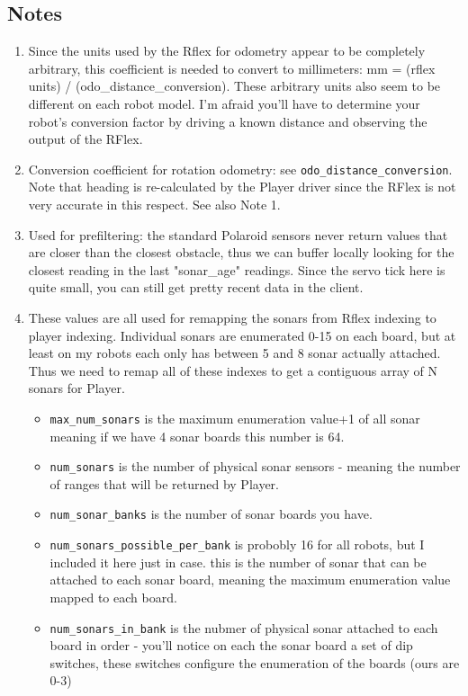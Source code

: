 \subsection*{Notes}
\begin{enumerate}
\item Since the units used by the Rflex for odometry appear to be completely
arbitrary, this coefficient is needed to convert to millimeters:
mm = (rflex units) / (odo\_distance\_conversion).  These arbitrary units also
seem to be different on each robot model. I'm afraid you'll have to determine
your robot's conversion factor by driving a known distance and observing the
output of the RFlex.
\item Conversion coefficient for rotation odometry: see {\tt odo\_distance\_conversion}. Note that heading is re-calculated by the Player driver since the RFlex is not very accurate in this respect. See also Note 1.
\item Used for prefiltering: the standard Polaroid sensors never return values that are closer than the closest obstacle, thus we can buffer locally looking for the closest reading in the last "sonar\_age" readings. Since the servo tick here is quite small, you can still get pretty recent data in the client.
\item These values are all used for remapping the sonars from Rflex indexing
to player indexing. Individual sonars are enumerated 0-15 on each board, but
at least on my robots each only has between 5 and 8 sonar actually attached.
Thus we need to remap all of these indexes to get a contiguous array of
N sonars for Player.
  \begin{itemize}
    \item {\tt max\_num\_sonars} is the maximum enumeration value+1 of all sonar
    meaning if we have 4 sonar boards this number is 64.
    \item {\tt num\_sonars} is the number of physical sonar sensors - meaning the number of ranges that will be returned by Player.
    \item {\tt num\_sonar\_banks} is the number of sonar boards you have.
    \item {\tt num\_sonars\_possible\_per\_bank} is probobly 16 for all robots,
    but I included it here just in case. this is the number of sonar that can
    be attached to each sonar board, meaning the maximum enumeration value
    mapped to each board.
    \item {\tt num\_sonars\_in\_bank} is the nubmer of physical sonar attached
    to each board in order - you'll notice on each the sonar board a set of dip
    switches, these switches configure the enumeration of the boards
    (ours are 0-3)


\end{itemize}
\end{enumerate}
